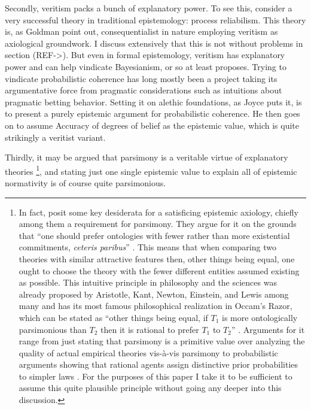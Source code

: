 \documentclass[12pt,numbers=noenddot]{scrartcl}
\begin{document}
Secondly, veritism packs a bunch of explanatory power. To see this, consider a very successful theory in traditional epistemology: process reliabilism. This theory is, as Goldman point out, consequentialist in nature \autocite{Goldman2002-GOLTUO-2} employing veritism as axiological groundwork. I discuss extensively that this is not without problems in section (REF->). But even in formal epistemology, veritism has explanatory power and can help vindicate Bayesianism, or so at least \textcite{Joyce2009-JOYAAC} proposes. Trying to vindicate probabilistic coherence has long mostly been a project taking its argumentative force from pragmatic considerations such as intuitions about pragmatic betting behavior. Setting it on alethic foundations, as Joyce puts it, is to present a purely epistemic argument for probabilistic coherence. He then goes on to assume Accuracy of degrees of belief as the epistemic value, which is quite strikingly a veritist variant.

Thirdly, it may be argued that parsimony is a veritable virtue of explanatory theories \footnote{In fact, \textcite[342]{Ahlstrom-Vij2013} posit some key desiderata for a satisficing epistemic axiology, chiefly among them a requirement for parsimony. They argue for it on the grounds that “one should prefer ontologies with fewer rather than more existential commitments, \emph{ceteris paribus}” \autocite{Ahlstrom-Vij2013}. This means that when comparing two theories with similar attractive features then, other things being equal, one ought to choose the theory with the fewer different entities assumed existing as possible. This intuitive principle in philosophy and the sciences was already proposed by Aristotle, Kant, Newton, Einstein, and Lewis among many \autocite[3]{sep-simplicity} and has its most famous philosophical realization in Occam's Razor, which can be stated as “other things being equal, if $T_1$ is more ontologically parsimonious than $T_2$ then it is rational to prefer $T_1$ to $T_2$” \autocite[7]{sep-simplicity}. Arguments for it range from just stating that parsimony is a primitive value over analyzing the quality of actual empirical theories vis-à-vis parsimony to probabilistic arguments showing that rational agents assign distinctive prior probabilities to simpler laws \autocite[11-26]{sep-simplicity}. For the purposes of this paper I take it to be sufficient to assume this quite plausible principle without going any deeper into this discussion.},
and stating just one single epistemic value to explain all of epistemic normativity is of course quite parsimonious.
\end{document}

